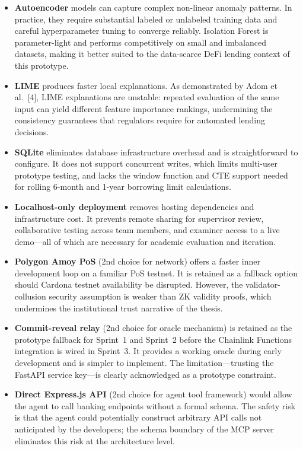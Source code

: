 \documentclass[12pt,a4paper]{report}
\begin{document}
\begin{itemize}[noitemsep]
\item \textbf{Autoencoder} models can capture complex non-linear anomaly patterns. In practice, they require substantial labeled or unlabeled training data and careful hyperparameter tuning to converge reliably. Isolation Forest is parameter-light and performs competitively on small and imbalanced datasets, making it better suited to the data-scarce DeFi lending context of this prototype.

\item \textbf{LIME} produces faster local explanations. As demonstrated by Adom et al.~[4], LIME explanations are unstable: repeated evaluation of the same input can yield different feature importance rankings, undermining the consistency guarantees that regulators require for automated lending decisions.

\item \textbf{SQLite} eliminates database infrastructure overhead and is straightforward to configure. It does not support concurrent writes, which limits multi-user prototype testing, and lacks the window function and CTE support needed for rolling 6-month and 1-year borrowing limit calculations.

\item \textbf{Localhost-only deployment} removes hosting dependencies and infrastructure cost. It prevents remote sharing for supervisor review, collaborative testing across team members, and examiner access to a live demo---all of which are necessary for academic evaluation and iteration.

\item \textbf{Polygon Amoy PoS} (2nd choice for network) offers a faster inner development loop on a familiar PoS testnet. It is retained as a fallback option should Cardona testnet availability be disrupted. However, the validator-collusion security assumption is weaker than ZK validity proofs, which undermines the institutional trust narrative of the thesis.

\item \textbf{Commit-reveal relay} (2nd choice for oracle mechanism) is retained as the prototype fallback for Sprint~1 and Sprint~2 before the Chainlink Functions integration is wired in Sprint~3. It provides a working oracle during early development and is simpler to implement. The limitation---trusting the FastAPI service key---is clearly acknowledged as a prototype constraint.

\item \textbf{Direct Express.js API} (2nd choice for agent tool framework) would allow the agent to call banking endpoints without a formal schema. The safety risk is that the agent could potentially construct arbitrary API calls not anticipated by the developers; the schema boundary of the MCP server eliminates this risk at the architecture level.


\end{itemize}
\end{document}

